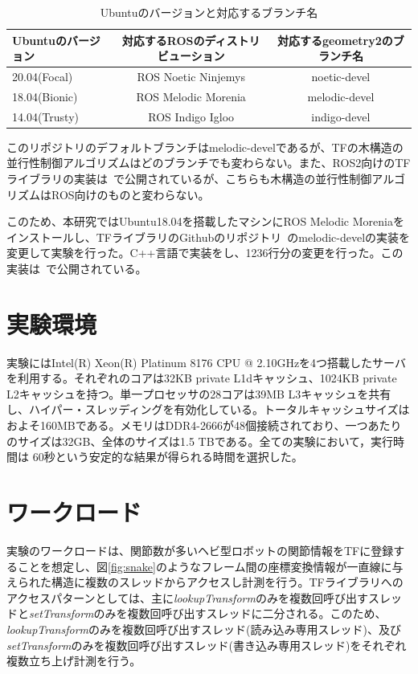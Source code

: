 \documentclass[a4paper]{jreport}	%
\begin{document}
\begin{table}[ht]
\centering
\begin{tabular}[t]{lcc}
\hline
Ubuntuのバージョン & 対応するROSのディストリビューション & 対応するgeometry2のブランチ名\\
\hline
20.04(Focal) & ROS Noetic Ninjemys & noetic-devel \\
18.04(Bionic) & ROS Melodic Morenia & melodic-devel \\
14.04(Trusty) & ROS Indigo Igloo & indigo-devel \\
\hline
\end{tabular}
\caption{Ubuntuのバージョンと対応するブランチ名}
\label{table:ubuntu-ros-branch}
\end{table}%

このリポジトリのデフォルトブランチはmelodic-develであるが、TFの木構造の並行性制御アルゴリズムはどのブランチでも変わらない。また、ROS2向けのTFライブラリの実装は~\cite{ros2-geometry2}で公開されているが、こちらも木構造の並行性制御アルゴリズムはROS向けのものと変わらない。

このため、本研究ではUbuntu18.04を搭載したマシンにROS Melodic Moreniaをインストールし、TFライブラリのGithubのリポジトリ~\cite{ros-geometry2}のmelodic-develの実装を変更して実験を行った。C++言語で実装をし、1236行分の変更を行った。この実装は~\cite{ogiwara-geometry2}で公開されている。

\section{実験環境}

実験にはIntel(R) Xeon(R) Platinum 8176 CPU @ 2.10GHzを4つ搭載したサーバを利用する。それぞれのコアは32KB private L1dキャッシュ、1024KB private L2キャッシュを持つ。単一プロセッサの28コアは39MB L3キャッシュを共有し、ハイパー・スレッディングを有効化している。トータルキャッシュサイズはおよそ160MBである。メモリはDDR4-2666が48個接続されており、一つあたりのサイズは32GB、全体のサイズは1.5 TBである。全ての実験において，実行時間は 60秒という安定的な結果が得られる時間を選択した。

\section{ワークロード}

実験のワークロードは、関節数が多いヘビ型ロボットの関節情報をTFに登録することを想定し、図\ref{fig:snake}のようなフレーム間の座標変換情報が一直線に与えられた構造に複数のスレッドからアクセスし計測を行う。TFライブラリへのアクセスパターンとしては、主に\textit{lookupTransform}のみを複数回呼び出すスレッドと\textit{setTransform}のみを複数回呼び出すスレッドに二分される。このため、\textit{lookupTransform}のみを複数回呼び出すスレッド(読み込み専用スレッド)、及び\textit{setTransform}のみを複数回呼び出すスレッド(書き込み専用スレッド)をそれぞれ複数立ち上げ計測を行う。
\end{document}
